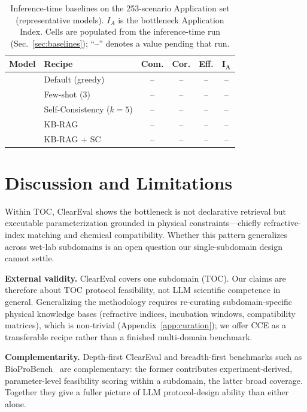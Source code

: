 \documentclass[conference]{IEEEtran}
\begin{document}
\begin{table}[htbp]
    \centering
    \caption{Inference-time baselines on the 253-scenario Application set
    (representative models). $I_A$ is the bottleneck Application Index. Cells are
    populated from the inference-time run (Sec.~\ref{sec:baselines}); ``--''
    denotes a value pending that run.}
    \label{tab:baselines}
    \small
    \begin{tabular}{l l cccc}
        \toprule
        \textbf{Model} & \textbf{Recipe} & \textbf{Com.} & \textbf{Cor.} & \textbf{Eff.} & $\boldsymbol{I_A}$ \\
        \midrule
          & Default (greedy)            & -- & -- & -- & -- \\
          & Few-shot (3)                & -- & -- & -- & -- \\
          & Self-Consistency ($k{=}5$)  & -- & -- & -- & -- \\
          & KB-RAG                      & -- & -- & -- & -- \\
          & KB-RAG $+$ SC               & -- & -- & -- & -- \\
        \bottomrule
    \end{tabular}
\end{table}

\section{Discussion and Limitations}\label{sec:discussion}
Within TOC, ClearEval shows the bottleneck is not declarative retrieval but
executable parameterization grounded in physical constraints---chiefly
refractive-index matching and chemical compatibility. Whether this pattern
generalizes across wet-lab subdomains is an open question our single-subdomain
design cannot settle.

\noindent\textbf{External validity.} ClearEval covers one subdomain (TOC). Our
claims are therefore about TOC protocol feasibility, not LLM scientific
competence in general. Generalizing the methodology requires re-curating
subdomain-specific physical knowledge bases (refractive indices, incubation
windows, compatibility matrices), which is non-trivial
(Appendix~\ref{app:curation}); we offer CCE as a transferable recipe rather than
a finished multi-domain benchmark.

\noindent\textbf{Complementarity.} Depth-first ClearEval and breadth-first
benchmarks such as BioProBench~\cite{bioprobench} are complementary: the former
contributes experiment-derived, parameter-level feasibility scoring within a
subdomain, the latter broad coverage. Together they give a fuller picture of LLM
protocol-design ability than either alone.
\end{document}
